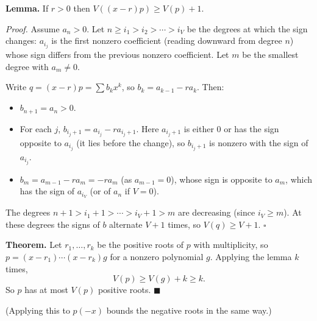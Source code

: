 \textbf{Lemma.} If $r>0$ then $V((x-r)p)\ge V(p)+1$.

\emph{Proof.} Assume $a_n>0$. Let $n\ge i_1>i_2>\cdots>i_V$ be the degrees at which the sign changes: $a_{i_j}$ is the first nonzero coefficient (reading downward from degree $n$) whose sign differs from the previous nonzero coefficient. Let $m$ be the smallest degree with $a_m\ne0$.

Write $q=(x-r)p=\sum b_kx^k$, so $b_k=a_{k-1}-ra_k$. Then:
\begin{itemize}
\item $b_{n+1}=a_n>0$.
\item For each $j$, $b_{i_j+1}=a_{i_j}-ra_{i_j+1}$. Here $a_{i_j+1}$ is either $0$ or has the sign opposite to $a_{i_j}$ (it lies before the change), so $b_{i_j+1}$ is nonzero with the sign of $a_{i_j}$.
\item $b_m=a_{m-1}-ra_m=-ra_m$ (as $a_{m-1}=0$), whose sign is opposite to $a_m$, which has the sign of $a_{i_V}$ (or of $a_n$ if $V=0$).
\end{itemize}
The degrees $n+1>i_1+1>\cdots>i_V+1>m$ are decreasing (since $i_V\ge m$). At these degrees the signs of $b$ alternate $V+1$ times, so $V(q)\ge V+1$. $\square$

\textbf{Theorem.} Let $r_1,\dots,r_k$ be the positive roots of $p$ with multiplicity, so $p=(x-r_1)\cdots(x-r_k)g$ for a nonzero polynomial $g$. Applying the lemma $k$ times,
\[V(p)\ge V(g)+k\ge k.\]
So $p$ has at most $V(p)$ positive roots. $\blacksquare$

(Applying this to $p(-x)$ bounds the negative roots in the same way.)
